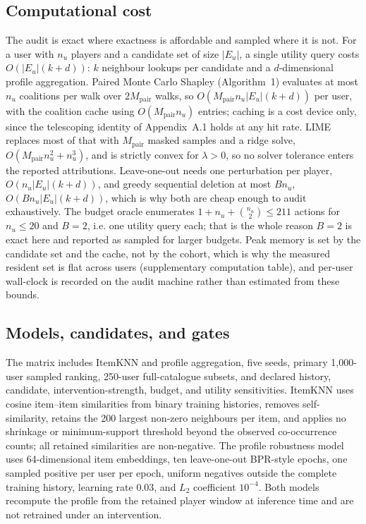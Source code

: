 \documentclass[manuscript,screen,review,anonymous]{acmart}
\begin{document}
\subsection{Computational cost}
The audit is exact where exactness is affordable and sampled where it is not. For a user with $n_u$ players and a candidate set of size $|E_u|$, a single utility query costs $O(|E_u|(k+d))$: $k$ neighbour lookups per candidate and a $d$-dimensional profile aggregation. Paired Monte Carlo Shapley (Algorithm~1) evaluates at most $n_u$ coalitions per walk over $2M_\mathrm{pair}$ walks, so $O(M_\mathrm{pair} n_u |E_u| (k+d))$ per user, with the coalition cache using $O(M_\mathrm{pair} n_u)$ entries; caching is a cost device only, since the telescoping identity of Appendix~A.1 holds at any hit rate. LIME replaces most of that with $M_\mathrm{pair}$ masked samples and a ridge solve, $O(M_\mathrm{pair} n_u^2 + n_u^3)$, and is strictly convex for $\lambda>0$, so no solver tolerance enters the reported attributions. Leave-one-out needs one perturbation per player, $O(n_u|E_u|(k+d))$, and greedy sequential deletion at most $Bn_u$, $O(B n_u |E_u| (k+d))$, which is why both are cheap enough to audit exhaustively. The budget oracle enumerates $1 + n_u + \binom{n_u}{2} \le 211$ actions for $n_u \le 20$ and $B=2$, i.e. one utility query each; that is the whole reason $B=2$ is exact here and reported as sampled for larger budgets. Peak memory is set by the candidate set and the cache, not by the cohort, which is why the measured resident set is flat across users (supplementary computation table), and per-user wall-clock is recorded on the audit machine rather than estimated from these bounds.

\subsection{Models, candidates, and gates}
The matrix includes ItemKNN and profile aggregation, five seeds, primary 1,000-user sampled ranking, 250-user full-catalogue subsets, and declared history, candidate, intervention-strength, budget, and utility sensitivities. ItemKNN uses cosine item--item similarities from binary training histories, removes self-similarity, retains the 200 largest non-zero neighbours per item, and applies no shrinkage or minimum-support threshold beyond the observed co-occurrence counts; all retained similarities are non-negative. The profile robustness model uses 64-dimensional item embeddings, ten leave-one-out BPR-style epochs, one sampled positive per user per epoch, uniform negatives outside the complete training history, learning rate $0.03$, and $L_2$ coefficient $10^{-4}$. Both models recompute the profile from the retained player window at inference time and are not retrained under an intervention.
\end{document}

